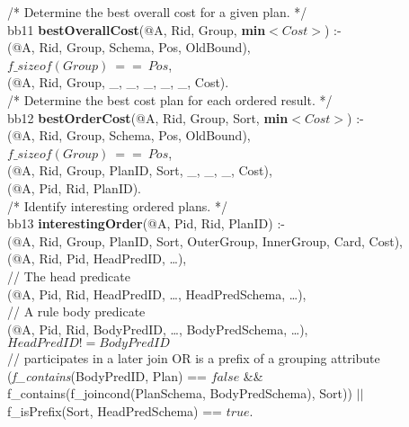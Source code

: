 \begin{figure*}
\ssp
\centering
\begin{boxedminipage}{\linewidth}
/* Determine the best overall cost for a given plan. */ \\
bb11 {\bf bestOverallCost}(@A, Rid, Group, {\bf min}$<Cost>$) :- \\
(@A, Rid, Group, Schema, Pos, OldBound), \\
\datalogspace $f\_sizeof(Group)\ ==\ Pos$, \\
(@A, Rid, Group, \_, \_, \_, \_, \_, Cost). \\

/* Determine the best cost plan for each ordered result. */ \\
bb12 {\bf bestOrderCost}(@A, Rid, Group, Sort, {\bf min}$<Cost>$) :- \\
(@A, Rid, Group, Schema, Pos, OldBound), \\
\datalogspace $f\_sizeof(Group)\ ==\ Pos$, \\
(@A, Rid, Group, PlanID, Sort, \_, \_, \_, Cost), \\
(@A, Pid, Rid, PlanID). \\

/* Identify interesting ordered plans. */ \\
bb13 {\bf interestingOrder}(@A, Pid, Rid, PlanID) :- \\
(@A, Rid, Group, PlanID, Sort, OuterGroup, InnerGroup, Card, Cost), \\
(@A, Rid, Pid, HeadPredID, \ldots), \\
\datalogspace // The head predicate \\
(@A, Pid, Rid, HeadPredID, \ldots, HeadPredSchema, \ldots),\\
\datalogspace // A rule body predicate \\
(@A, Pid, Rid, BodyPredID, \ldots, BodyPredSchema, \ldots),\\
\datalogspace $HeadPredID != BodyPredID$ \\
\datalogspace // participates in a later join OR is a prefix of a grouping attribute \\ 
\datalogspace ({\em f\_contains}(BodyPredID, Plan) ==  $false$ \&\& \\
\datalogspace f\_contains(f\_joincond(PlanSchema, BodyPredSchema), Sort)) $||$ \\
\datalogspace f\_isPrefix(Sort, HeadPredSchema) ==  $true$.  \\


\end{boxedminipage}
\end{figure*}
